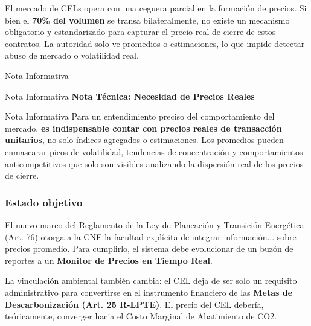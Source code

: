 \documentclass{cel}
\begin{document}
El mercado de CELs opera con una \textquotedbl{}ceguera parcial\textquotedbl{} en la formación de precios. Si bien el \textbf{70\% del volumen} se transa bilateralmente, no existe un mecanismo obligatorio y estandarizado para capturar el precio real de cierre de estos contratos. La autoridad solo ve \textquotedbl{}promedios\textquotedbl{} o estimaciones, lo que impide detectar abuso de mercado o volatilidad real.


\vspace{0.2cm}
\begin{glowBox}[gobmxDorado]{Nota Informativa}

\end{glowBox}
\vspace{0.2cm}
\begin{glowBox}[gobmxDorado]{Nota Informativa}
\textbf{Nota Técnica: Necesidad de Precios Reales}
\end{glowBox}
\vspace{0.2cm}
\begin{glowBox}[gobmxDorado]{Nota Informativa}
Para un entendimiento preciso del comportamiento del mercado, \textbf{es indispensable contar con precios reales de transacción unitarios}, no solo índices agregados o estimaciones. Los promedios pueden enmascarar picos de volatilidad, tendencias de concentración y comportamientos anticompetitivos que solo son visibles analizando la dispersión real de los precios de cierre.
\end{glowBox}

\subsubsection{Estado objetivo}
\nopagebreak

El nuevo marco del Reglamento de la Ley de Planeación y Transición Energética (Art. 76) otorga a la CNE la facultad explícita de \textquotedbl{}integrar información... sobre precios promedio\textquotedbl{}. Para cumplirlo, el sistema debe evolucionar de un \textquotedbl{}buzón de reportes\textquotedbl{} a un \textbf{Monitor de Precios en Tiempo Real}.


La vinculación ambiental también cambia: el CEL deja de ser solo un requisito administrativo para convertirse en el instrumento financiero de las \textbf{Metas de Descarbonización (Art. 25 R-LPTE)}. El precio del CEL debería, teóricamente, converger hacia el Costo Marginal de Abatimiento de CO2.
\end{document}
